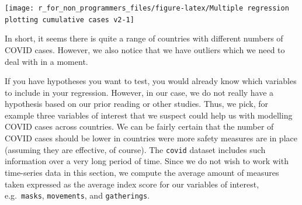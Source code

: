 \documentclass[
]{book}
\begin{document}
\begin{center}\texttt{[image: r\_for\_non\_programmers\_files/figure-latex/Multiple regression plotting cumulative cases v2-1]} \end{center}

In short, it seems there is quite a range of countries with different numbers of COVID cases. However, we also notice that we have outliers which we need to deal with in a moment.

If you have hypotheses you want to test, you would already know which variables to include in your regression. However, in our case, we do not really have a hypothesis based on our prior reading or other studies. Thus, we pick, for example three variables of interest that we suspect could help us with modelling COVID cases across countries. We can be fairly certain that the number of COVID cases should be lower in countries were more safety measures are in place (assuming they are effective, of course). The \texttt{covid} dataset includes such information over a very long period of time. Since we do not wish to work with time-series data in this section, we compute the average amount of measures taken expressed as the average index score for our variables of interest, e.g.~\texttt{masks}, \texttt{movements}, and \texttt{gatherings}.
\end{document}
